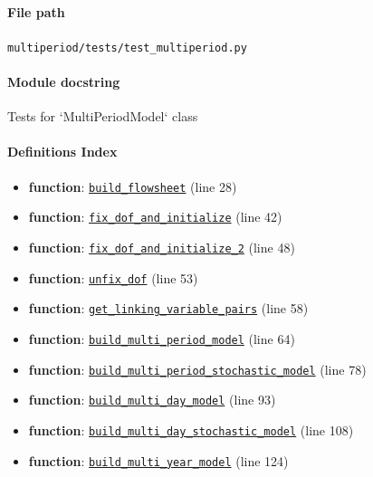 \documentclass[11pt]{report}
\begin{document}
\paragraph{File path} \texttt{multiperiod/tests/test\_multiperiod.py}
\paragraph{Module docstring} Tests for `MultiPeriodModel` class
\paragraph{Definitions Index}
\begin{itemize}[leftmargin=*]
  \item \textbf{function}: \hyperref[def:multiperiod-tests-test_multiperiod.py:build_flowsheet:L28]{\texttt{build\_flowsheet}} (line 28)
  \item \textbf{function}: \hyperref[def:multiperiod-tests-test_multiperiod.py:fix_dof_and_initialize:L42]{\texttt{fix\_dof\_and\_initialize}} (line 42)
  \item \textbf{function}: \hyperref[def:multiperiod-tests-test_multiperiod.py:fix_dof_and_initialize_2:L48]{\texttt{fix\_dof\_and\_initialize\_2}} (line 48)
  \item \textbf{function}: \hyperref[def:multiperiod-tests-test_multiperiod.py:unfix_dof:L53]{\texttt{unfix\_dof}} (line 53)
  \item \textbf{function}: \hyperref[def:multiperiod-tests-test_multiperiod.py:get_linking_variable_pairs:L58]{\texttt{get\_linking\_variable\_pairs}} (line 58)
  \item \textbf{function}: \hyperref[def:multiperiod-tests-test_multiperiod.py:build_multi_period_model:L64]{\texttt{build\_multi\_period\_model}} (line 64)
  \item \textbf{function}: \hyperref[def:multiperiod-tests-test_multiperiod.py:build_multi_period_stochastic_model:L78]{\texttt{build\_multi\_period\_stochastic\_model}} (line 78)
  \item \textbf{function}: \hyperref[def:multiperiod-tests-test_multiperiod.py:build_multi_day_model:L93]{\texttt{build\_multi\_day\_model}} (line 93)
  \item \textbf{function}: \hyperref[def:multiperiod-tests-test_multiperiod.py:build_multi_day_stochastic_model:L108]{\texttt{build\_multi\_day\_stochastic\_model}} (line 108)
  \item \textbf{function}: \hyperref[def:multiperiod-tests-test_multiperiod.py:build_multi_year_model:L124]{\texttt{build\_multi\_year\_model}} (line 124)

\end{itemize}
\end{document}
